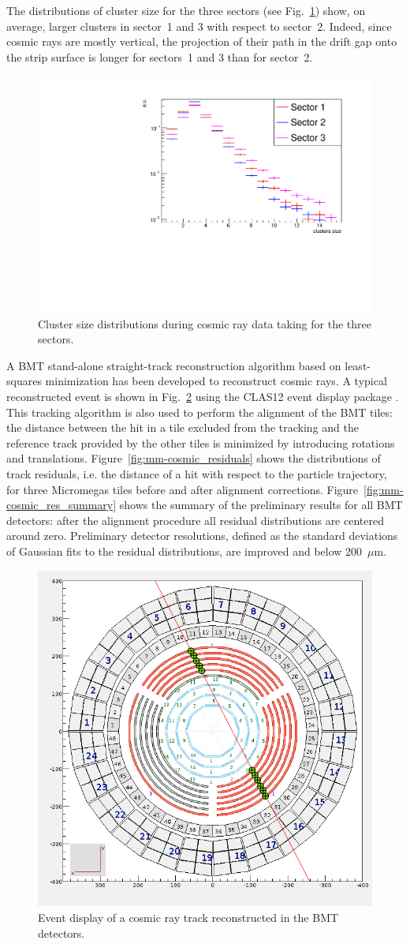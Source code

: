 The distributions of cluster size for the three sectors (see Fig.~\ref{fig:mm-cosmic_cls}) show, on average, larger clusters in
sector~1 and 3 with respect to sector~2. Indeed, since cosmic rays are mostly vertical, the projection of their path in the drift
gap onto the strip surface is longer for sectors~1 and 3 than for sector~2.

\begin{figure}[htb]
 \includegraphics[width=.45\textwidth]{images/cosmic_cluster_size.pdf}
 \caption{Cluster size distributions during cosmic ray data taking for the three sectors.}
 \label{fig:mm-cosmic_cls}
\end{figure}

A BMT stand-alone straight-track reconstruction algorithm based on least-squares minimization has been developed to reconstruct
cosmic rays. A typical reconstructed event is shown in Fig.~\ref{fig:mm-cosmic_ced} using the CLAS12 event display package
\cite{recon-nim}. This tracking algorithm is also used to perform the alignment of the BMT tiles: the distance between 
the hit in a
tile excluded from the tracking and the reference track provided by the other tiles is minimized by introducing rotations and
translations. Figure~\ref{fig:mm-cosmic_residuals} shows the distributions of track residuals, i.e. the distance of a hit with
respect to the particle trajectory, for three Micromegas tiles before and after alignment corrections.
Figure~\ref{fig:mm-cosmic_res_summary} shows the summary of the preliminary results for all BMT detectors: after the
alignment procedure all residual distributions are centered around zero. Preliminary detector resolutions, defined as the standard
deviations of Gaussian fits to the residual distributions, are improved and below 200~$\mu$m. 

\begin{figure}[htb]
 \includegraphics[width=.4\textwidth]{images/cosmic_NIM.png}
 \caption{Event display of a cosmic ray track reconstructed in the BMT detectors.}
 \label{fig:mm-cosmic_ced}
\end{figure}

